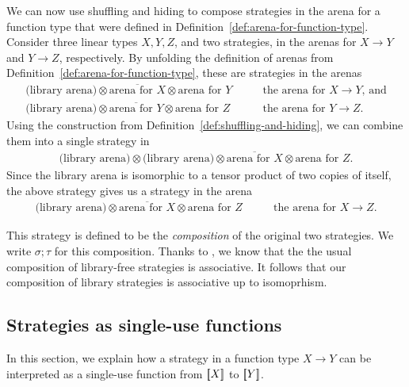 We can now use shuffling and hiding to compose strategies in the arena for a function type that were defined in Definition~\ref{def:arena-for-function-type}.
Consider three linear types $X, Y, Z$, and two strategies, in the arenas for $X \to Y$ and $Y \to Z$, respectively.
 By unfolding the definition of arenas from Definition~\ref{def:arena-for-function-type}, these are strategies in the arenas 
\begin{align*}
\text{(library arena)} \otimes \overline{\text{arena for $X$}} \otimes \text{arena for $Y$} & \qquad \text{the arena for $X \to Y$, and}
\\
\text{(library arena)} \otimes \overline{\text{arena for $Y$}} \otimes \text{arena for $Z$} & \qquad \text{the arena for $Y \to Z$}.
\end{align*}
Using the construction from Definition~\ref{def:shuffling-and-hiding}, we can combine them into a single  strategy in 
\begin{align*}
\text{(library arena)} \otimes  \text{(library arena)}\otimes \overline{\text{arena for $X$}} \otimes \text{arena for $Z$}.
\end{align*}
Since the library arena is isomorphic to a tensor product of two copies of itself, the above strategy gives us a strategy in the arena 
\begin{align*}
    \text{(library arena)} \otimes   \overline{\text{arena for $X$}} \otimes \text{arena for $Z$} & \qquad \text{the arena for $X \to Z$.}
    \end{align*}

This strategy is defined to be the \emph{composition} of the original two  strategies. We write $\sigma; \tau$ for this composition. Thanks to \cite[Proposition~1.2]{abramsky2013semantics}, we know that the the usual
composition of library-free strategies is associative. It follows that our composition of library strategies is associative 
up to isomoprhism. 


\subsection{Strategies as single-use functions}
In this section, we explain how a strategy in a function type $X \to Y$ can be interpreted as a single-use function from $[{\kern-0.45ex}[X]{\kern-0.45ex}]$ to $[{\kern-0.45ex}[Y]{\kern-0.45ex}]$.




